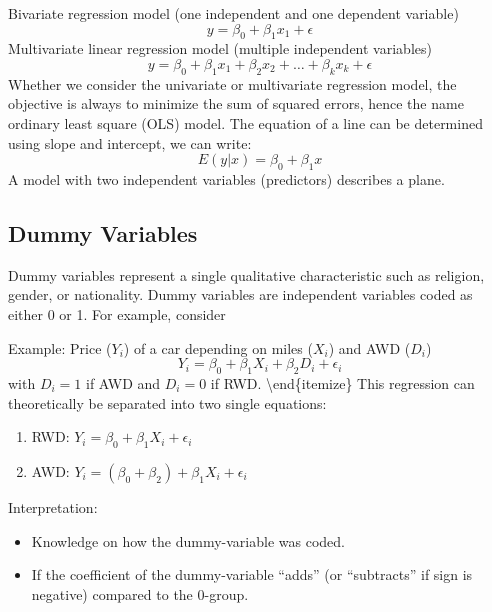 \documentclass[
]{article}
\begin{document}
Bivariate regression model (one independent and one dependent variable)
\begin{equation*}
            y = \beta_0 + \beta_1 x_1 + \epsilon
        \end{equation*}
Multivariate linear regression model (multiple independent variables)
\begin{equation*}
            y = \beta_0 + \beta_1 x_1 + \beta_2 x_2 + \dots + \beta_k x_k + \epsilon
        \end{equation*}
Whether we consider the univariate or multivariate regression model, the objective is always to minimize the sum of squared errors, hence the name ordinary least square (OLS) model. The equation of a line can be determined using slope and intercept, we can write:
\begin{equation*}
            E(y|x) = \beta_0 + \beta_1 x
        \end{equation*}
A model with two independent variables (predictors) describes a plane.

\hypertarget{dummy-variables}{%
\subsection{Dummy Variables}\label{dummy-variables}}

Dummy variables represent a single qualitative characteristic such as religion, gender, or nationality. Dummy variables are independent variables coded as either 0 or 1. For example, consider

Example: Price (\(Y_i\)) of a car depending on miles (\(X_i\)) and AWD (\(D_i\))
\begin{equation*}
                    Y_i = \beta_0 + \beta_1 X_i + \beta_2 D_i + \epsilon_i
                \end{equation*}
with \(D_i = 1\) if AWD and \(D_i = 0\) if RWD.
\textbackslash end\{itemize\}
This regression can theoretically be separated into two single equations:

\begin{enumerate}
            \item RWD: $Y_i = \beta_0 + \beta_1 X_i + \epsilon_i$
            \item AWD: $Y_i = (\beta_0 + \beta_2 )+ \beta_1 X_i + \epsilon_i$
        \end{enumerate}

Interpretation:

\begin{itemize}
            \item Knowledge on how the dummy-variable was coded.
            \item If the coefficient of the dummy-variable ``adds'' (or ``subtracts'' if sign is negative) compared to the 0-group.
        \end{itemize}
\end{document}

